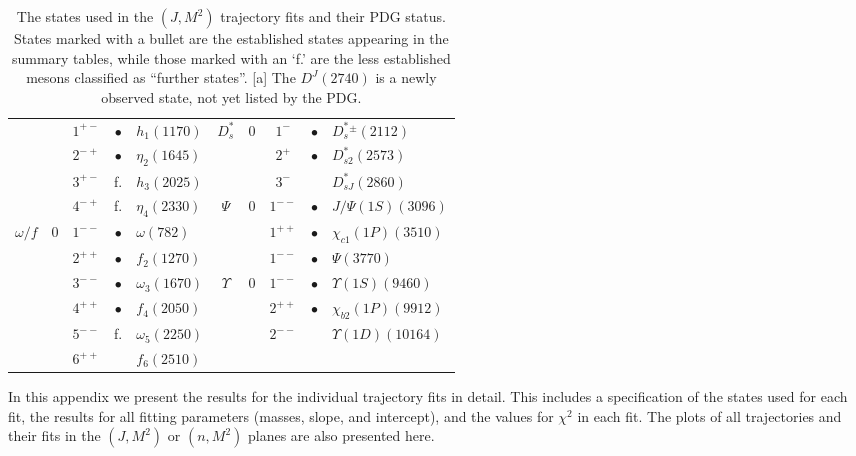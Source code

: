 \documentclass[11pt,a4]{article}
\begin{document}
\begin{table}[t!]
\begin{tabular}{|c|c|c|c|l|c|c|c|c|l|}
							& &\(1^{+-}\) & \(\bullet\) & \(h_1(1170)\) &				  \(D^*_s\) & 0&\(1^-\) & \(\bullet\) & \(D^*_s{}^\pm(2112)\) \\

							& &\(2^{-+}\) & \(\bullet\) & \(\eta_2(1645)\) &				            &	& \(2^+\) & \(\bullet\) & \(D^*_{s2}(2573)\) \\

							& &\(3^{+-}\) & f. & \(h_3(2025)\) &				            &	& \(3^-\) & & \(D^*_{sJ}(2860)\) \\ \cline{6-9}

							& &\(4^{-+}\) & f. & \(\eta_4(2330)\) &					 \(\Psi\)& 0& \(1^{--}\) & \(\bullet\) & \(J/\Psi(1S)(3096)\) \\ \cline{1-5}

		\(\omega/f\)&0&\(1^{--}\)& \(\bullet\) & \(\omega(782)\) &				            &	& \(1^{++}\) & \(\bullet\) & \(\chi_{c1}(1P)(3510)\) \\

							& &\(2^{++}\) & \(\bullet\) & \(f_2(1270)\) &				            &	& \(1^{--}\) & \(\bullet\) & \(\Psi(3770)\) \\ \cline{6-10}

							& &\(3^{--}\) & \(\bullet\) & \(\omega_3(1670)\) &				  \(\Upsilon\) & 0 & \(1^{--}\)	& \(\bullet\) & \(\Upsilon(1S)(9460)\) \\

							& &\(4^{++}\) & \(\bullet\) & \(f_4(2050)\) &				            &	& \(2^{++}\) & \(\bullet\) & \(\chi_{b2}(1P)(9912)\) \\

							& &\(5^{--}\) & f. & \(\omega_5(2250)\) &				             & & \(2^{--}\) & & \(\Upsilon(1D)(10164)\) \\

							& &\(6^{++}\) && \(f_6(2510)\) &				            &	&  & \\ \hline

	\end{tabular}

	\caption{\label{tab:states_j} The states used in the \((J,M^2)\) trajectory fits and their PDG status. States marked with a bullet are the established states appearing in the summary tables, while those marked with an `f.' are the less established mesons classified as ``further states''. [a] The \(D^J(2740)\) is a newly observed state, not yet listed by the PDG.}
\end{table}

	In this appendix we present the results for the individual trajectory fits in detail. This includes a specification of the states used for each fit, the results for all fitting parameters (masses, slope, and intercept), and the values for \(\chi^2\) in each fit. The plots of all trajectories and their fits in the \((J,M^2)\) or \((n,M^2)\) planes are also presented here.
\end{document}
